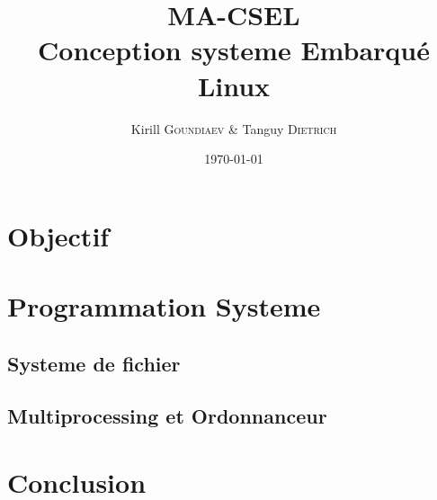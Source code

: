 \documentclass[
	a4paper, %
	10pt, %
]{CSUniSchoolLabReport}
\title{MA-CSEL \\ Conception systeme Embarqué Linux } %
\author{Kirill \textsc{Goundiaev} \& Tanguy \textsc{Dietrich}} %
\date{\today} %
\begin{document}
\maketitle %

\newpage

\tableofcontents
\newpage


\section{Objectif}

\section{Programmation Systeme}

\subsection{Systeme de fichier}\label{filesystem}

\subsection{Multiprocessing et Ordonnanceur}\label{multiprocess}

\section{Conclusion}


\printbibliography %

\end{document}
